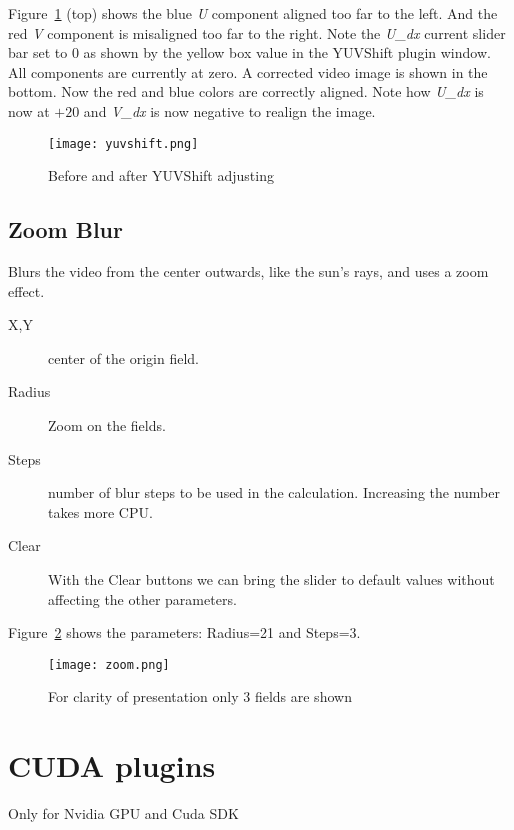 Figure~\ref{fig:yuvshift} (top) shows the blue \textit{U} component aligned too far to the left. And the red \textit{V} component is misaligned too far to the right. Note the \textit{U\_dx} current slider bar set to $0$ as shown by the yellow box value in the YUVShift plugin window. All components are currently at zero.
A corrected video image is shown in the bottom. Now the red and blue colors are correctly aligned. Note how \textit{U\_dx} is now at $+20$ and \textit{V\_dx} is now negative to realign the image.

\begin{figure}[hbtp]
    \centering
    \texttt{[image: yuvshift.png]}
    \caption{Before and after YUVShift adjusting}
    \label{fig:yuvshift}
\end{figure}

\subsection{Zoom Blur}%
\label{sub:zoom_blur}

Blurs the video from the center outwards, like the sun’s rays, and uses a zoom effect.

\begin{description}
    \item[X,Y] center of the origin field.
    \item[Radius] Zoom on the fields.
    \item[Steps] number of blur steps to be used in the calculation. Increasing the number takes more CPU.
    \item[Clear] With the Clear buttons we can bring the slider to default values without affecting the other parameters.
\end{description}

Figure~\ref{fig:zoom} shows the parameters: Radius=21 and Steps=3.

\begin{figure}[hbtp]
    \centering
    \texttt{[image: zoom.png]}
    \caption{For clarity of presentation only 3 fields are shown}
    \label{fig:zoom}
\end{figure}

\section{CUDA plugins}%
\label{sec:cuda_plugins}

Only for Nvidia GPU and Cuda SDK

